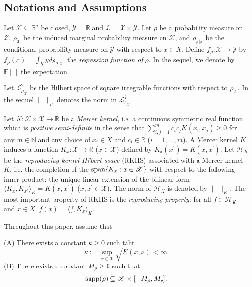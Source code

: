 \documentclass[twoside,11pt]{amsart}
\theoremstyle{theorem}
\theoremstyle{definition}
\theoremstyle{remark}
\def\Z{{\mathbb Z}}        %
\def\R{{\mathbb R}}        %
\def\<{{\langle}}
\def\>{{\rangle}}
\def\E{{\mathbb E}}        %
\def\L{{\mathscr L}}
\def\L2{{\mathscr L}^2_{\rho_\X}}
\def\M{M_\rho}
\def\H{{\mathscr H}}
\def\X{{\mathscr X}}
\def\Y{{\mathscr Y}}
\def\Z{{\mathscr Z}}
\def\N{{\mathbb N}}
\def\supp{{\rm supp}}
\def\span{{\rm span}}
\def\ka{\kappa}
\begin{document}
\subsection{Notations and Assumptions} 
Let $\X\subseteq \R^n$ be closed, $\Y=\R$ and $\Z=\X\times \Y$. 
Let $\rho$ be a probability measure on $\Z$, $\rho_{\X}$ be the induced marginal probability measure on $\X$,
and $\rho_{\Y|x}$ be the conditional probability measure on $\Y$ with respect to $x\in
X$. Define $f_\rho:\X\to \Y$ by $f_\rho (x) = \int_\Y y d \rho_{\Y|x}$, 
the \emph{regression function of $\rho$}. In the sequel, we denote by $\E[\ ]$ the expectation. 

Let $\L2$ be the Hilbert space of
square integrable functions with respect to $\rho_\X$. In the sequel $\|\ \|_\rho$
denotes the norm in $\L2$.

Let $K:\X\times \X\to \R$ be a \emph{Mercer kernel}, i.e. a
continuous symmetric real function which is \emph{positive
semi-definite} in the sense that $\sum_{i,j=1}^m c_i c_j K(x_i,
x_j)\geq 0$ for any $m\in \N$ and any choice of $x_i\in X$ and
$c_i \in \R$ ($i=1,\ldots,m$). A Mercer kernel $K$ induces
a function $K_x : \X\to \R$ ($x\in \X$) defined by $ K_x(x^\prime) = K(x,x^\prime)$. 
Let $\H_K$ be the \emph{reproducing kernel Hilbert space} (RKHS)
associated with a Mercer kernel $K$, i.e. the completion of the $\span\{K_x: x\in \X\}$
with respect to the following inner product: the unique linear extension of the
bilinear form $\<K_x, K_{x^\prime}\>_K = K(x,x^\prime)$ ($x,x^\prime \in \X$). The norm
of $\H_K$ is denoted by $\|\ \|_K$. The most important property of RKHS is the \emph{reproducing property}:
for all $f\in \H_K$ and $x\in X$, $f(x)=\<f,K_x\>_K$. 

Throughout this paper, assume that

\noindent (A) There exists a constant $\ka\geq 0$ such taht
\begin{equation*} 
\kappa:=\sup_{x\in \X} \sqrt{K(x,x)} < \infty.
\end{equation*}
\noindent (B) There exists a constant $\M \geq 0$ such that
\[ \supp(\rho)\subseteq \X\times [-\M, \M]. \]
\end{document}
